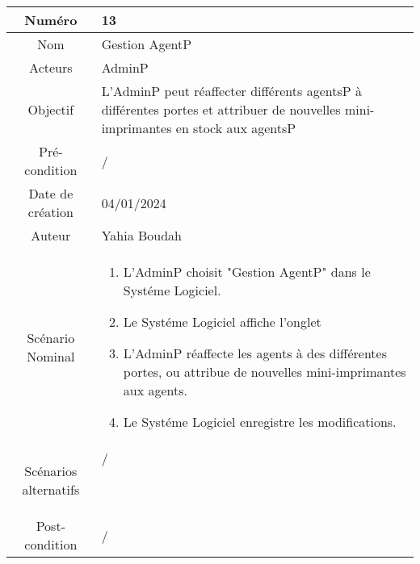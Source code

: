 


\begin{tabular}{ |c|p{12cm}| }
    \hline
    Numéro & 13 \\
    \hline
    Nom & Gestion AgentP \\
    \hline
    Acteurs & AdminP \\ 
    \hline
    Objectif & L'AdminP peut réaffecter différents agentsP à différentes portes et attribuer de nouvelles mini-imprimantes en stock aux agentsP \\ 
    \hline
    Pré-condition & / \\
    \hline
    Date de création & 04/01/2024 \\
    \hline
    Auteur & Yahia Boudah \\
    \hline
    Scénario Nominal & \begin{enumerate}
        \item L'AdminP choisit "Gestion AgentP" dans le Systéme Logiciel.
        \item Le Systéme Logiciel affiche l'onglet
        \item L'AdminP réaffecte les agents à des différentes portes, ou attribue de nouvelles mini-imprimantes aux agents.
        \item Le Systéme Logiciel enregistre les modifications.
    \end{enumerate} \\
    \hline
    Scénarios alternatifs & \begin{description}
        \item[/]
    \end{description} \\
    \hline
    Post-condition & / \\
    \hline
\end{tabular}